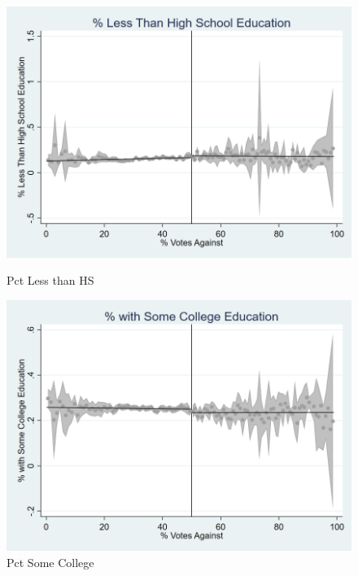 \begin{figure}[ht]
    \begin{minipage}[b]{0.40\textwidth}
        \centering
        \includegraphics[width=\textwidth,keepaspectratio]{images/cov_smoothness_pctlesshs.png}
        \caption*{Pct Less than HS}
        \label{fig:pctlesshs_sm}
    \end{minipage}
    \hfill
    \begin{minipage}[b]{0.40\textwidth}
        \centering
        \includegraphics[width=\textwidth,keepaspectratio]{images/cov_smoothness_pctsomecoll.png}
        \caption*{Pct Some College}
        \label{fig:pctsomecoll_sm}
    \end{minipage}
    
    

\end{figure}
